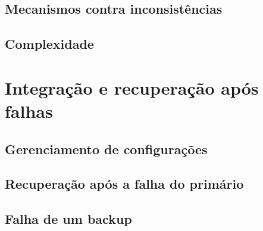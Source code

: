 \subsection{Mecanismos contra inconsistências}

\subsection{Complexidade}

\section{Integração e recuperação após falhas}

\subsection{Gerenciamento de configurações}

\subsection{Recuperação após a falha do primário}

\subsection{Falha de um backup}

